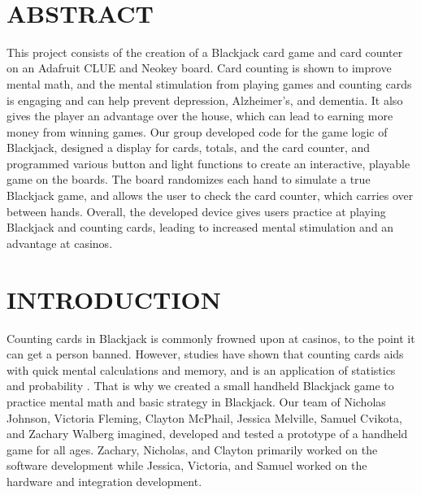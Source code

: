 \documentclass[12pt]{article}
\begin{document}
\begin{titlepage}
\begin{minipage}{0.8\textwidth}
\begin{flushleft}
		\end{flushleft}
	\end{minipage}\\[2 cm]
	
	\vfill
	
\end{titlepage}

\tableofcontents
\pagebreak

\section{ABSTRACT}
This project consists of the creation of a Blackjack card game and card counter on an Adafruit CLUE and Neokey board. Card counting is shown to improve mental math, and the mental stimulation from playing games and counting cards is engaging and can help prevent depression, Alzheimer’s, and dementia. It also gives the player an advantage over the house, which can lead to earning more money from winning games. Our group developed code for the game logic of Blackjack, designed a display for cards, totals, and the card counter, and programmed various button and light functions to create an interactive, playable game on the boards. The board randomizes each hand to simulate a true Blackjack game, and allows the user to check the card counter, which carries over between hands. Overall, the developed device gives users practice at playing Blackjack and counting cards, leading to increased mental stimulation and an advantage at casinos.

\section{INTRODUCTION}
Counting cards in Blackjack is commonly frowned upon at casinos, to the point it can get a person banned. However, studies have shown that counting cards aids with quick mental calculations and memory, and is an application of statistics and probability \cite{crafton2020counting}. That is why we created a small handheld Blackjack game to practice mental math and basic strategy in Blackjack. Our team of Nicholas Johnson, Victoria Fleming, Clayton McPhail, Jessica Melville, Samuel Cvikota, and Zachary Walberg imagined, developed and tested a prototype of a handheld game for all ages. Zachary, Nicholas, and Clayton primarily worked on the software development while Jessica, Victoria, and Samuel worked on the hardware and integration development. 
\end{document}
